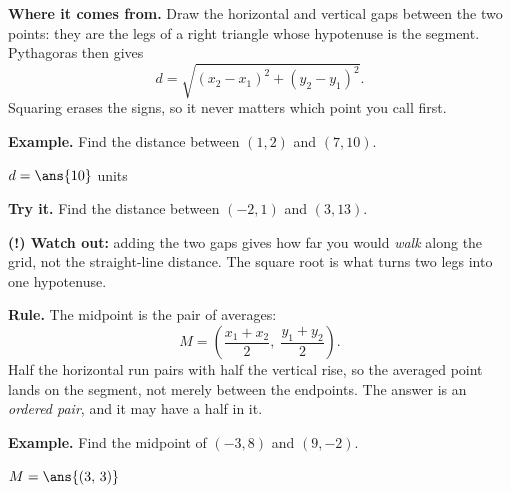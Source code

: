 \documentclass[12pt]{article}
\begin{document}


\begin{formulabox}
\textbf{Where it comes from.} Draw the horizontal and vertical gaps between the
two points: they are the legs of a right triangle whose hypotenuse is the
segment. Pythagoras then gives
\[ d = \sqrt{(x_2-x_1)^2 + (y_2-y_1)^2}. \]
Squaring erases the signs, so it never matters which point you call first.
\end{formulabox}

\begin{examplebox}
\textbf{Example.} Find the distance between $(1,2)$ and $(7,10)$.

$d = \ans{10}$ units
\end{examplebox}

\begin{tryitbox}
\textbf{Try it.} Find the distance between $(-2,1)$ and $(3,13)$.\\[2pt]
\end{tryitbox}

\begin{watchoutbox}
\textbf{(!) Watch out:} adding the two gaps gives how far you would \emph{walk}
along the grid, not the straight-line distance. The square root is what turns
two legs into one hypotenuse.
\end{watchoutbox}


\begin{formulabox}
\textbf{Rule.} The midpoint is the pair of averages:
\[ M = \left( \frac{x_1+x_2}{2},\; \frac{y_1+y_2}{2} \right). \]
Half the horizontal run pairs with half the vertical rise, so the averaged point
lands on the segment, not merely between the endpoints. The answer is an
\emph{ordered pair}, and it may have a half in it.
\end{formulabox}

\begin{examplebox}
\textbf{Example.} Find the midpoint of $(-3,8)$ and $(9,-2)$.

$M = \ans{(3,\, 3)}$
\end{examplebox}
\end{document}
